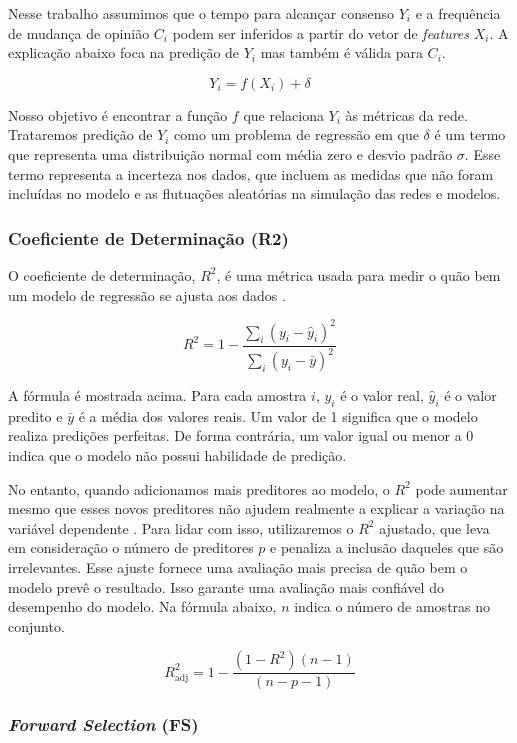 Nesse trabalho assumimos que o tempo para alcançar consenso \(Y_i\) e a
frequência de mudança de opinião \(C_i\) podem ser inferidos a partir do
vetor de \emph{features} \(X_i\). A explicação abaixo foca na predição
de \(Y_i\) mas também é válida para \(C_i\).

\[
Y_i = f(X_i)+\delta
\]

Nosso objetivo é encontrar a função \(f\) que relaciona \(Y_i\) às
métricas da rede. Trataremos predição de \(Y_i\) como um problema de
regressão em que \(\delta\) é um termo que representa uma distribuição
normal com média zero e desvio padrão \(\sigma\). Esse termo representa
a incerteza nos dados, que incluem as medidas que não foram incluídas no
modelo e as flutuações aleatórias na simulação das redes e modelos.

\subsubsection{Coeficiente de Determinação
(R2)}\label{coeficiente-de-determinauxe7uxe3o-r2}

O coeficiente de determinação, \(R^2\), é uma métrica usada para medir o
quão bem um modelo de regressão se ajusta aos dados
\cite{johnson2017r2}.

\[
R^2=1-\dfrac{\sum_i (y_i - \hat{y}_i)^2}{\sum_i (y_i - \bar{y})^2}
\]

A fórmula é mostrada acima. Para cada amostra \(i\), \(y_i\) é o valor
real, \(\hat{y}_i\) é o valor predito e \(\bar{y}\) é a média dos
valores reais. Um valor de 1 significa que o modelo realiza predições
perfeitas. De forma contrária, um valor igual ou menor a 0 indica que o
modelo não possui habilidade de predição.

No entanto, quando adicionamos mais preditores ao modelo, o \(R^2\) pode
aumentar mesmo que esses novos preditores não ajudem realmente a
explicar a variação na variável dependente
\cite{bishop2006pattern, murphy2012machine}. Para lidar com isso,
utilizaremos o \(R^2\) ajustado, que leva em consideração o número de
preditores \(p\) e penaliza a inclusão daqueles que são irrelevantes.
Esse ajuste fornece uma avaliação mais precisa de quão bem o modelo
prevê o resultado. Isso garante uma avaliação mais confiável do
desempenho do modelo. Na fórmula abaixo, \(n\) indica o número de
amostras no conjunto.

\[
R^2_\text{adj} = 1 - \dfrac{(1 - R^2) (n - 1)}{(n - p - 1)}
\]

\subsubsection{\texorpdfstring{\emph{Forward Selection}
(FS)}{Forward Selection (FS)}}\label{forward-selection-fs}

